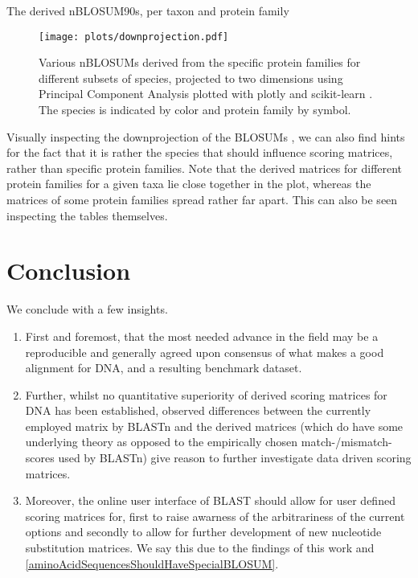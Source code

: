 \documentclass{article}
\begin{document}
	\begin{table}
	
	\caption{The derived nBLOSUM90s, per taxon and protein family}
	\end{table}
\onecolumn
\pagebreak

\begin{figure}[!htp]
		\centering
		\texttt{[image: plots/downprojection.pdf]}
		\caption{Various nBLOSUMs derived from the specific protein
		families for different subsets of species, projected to two
		dimensions using Principal Component Analysis
	\cite{leverPrincipalComponentAnalysis2017} plotted with plotly
\cite{plotly} and scikit-learn \cite{scikit-learn}. The species is indicated
by color and protein family by symbol.}
	\end{figure}

Visually inspecting the downprojection of the BLOSUMs , we can also find
hints for the fact that it is rather the species that should influence scoring
matrices, rather than specific protein families. Note that the derived matrices
for different protein families for a given taxa lie close together in the plot,
whereas the matrices of some protein families spread rather far apart. This can also be
seen inspecting the tables themselves.

\section{Conclusion}
We conclude with a few insights.
\begin{enumerate} 
	\item First and foremost, that the most 
needed advance in the field may be a reproducible and generally agreed upon
consensus of what makes a good alignment for DNA, and a resulting benchmark
dataset.

	\item Further, whilst no quantitative superiority of derived scoring matrices for DNA
has been established, observed differences between the currently employed matrix by BLASTn and the derived matrices (which do have some underlying theory as
opposed to the empirically chosen match-/mismatch-scores used by BLASTn) give
reason to further investigate data driven scoring matrices. 

\item Moreover, the
online user interface of BLAST should allow for user defined scoring matrices
for, first to raise awarness of the arbitrariness of the current options and
secondly to allow for further development of new nucleotide substitution
matrices. We say this due to the findings of this work and \ref{aminoAcidSequencesShouldHaveSpecialBLOSUM}.

\end{enumerate}

\pagebreak

\nocite{reback2020pandas}
\nocite{BiopythonREADMERst}
\nocite{10.1093/bioinformatics/btp163}
\nocite{harris2020array}

\printbibliography
\end{document}
